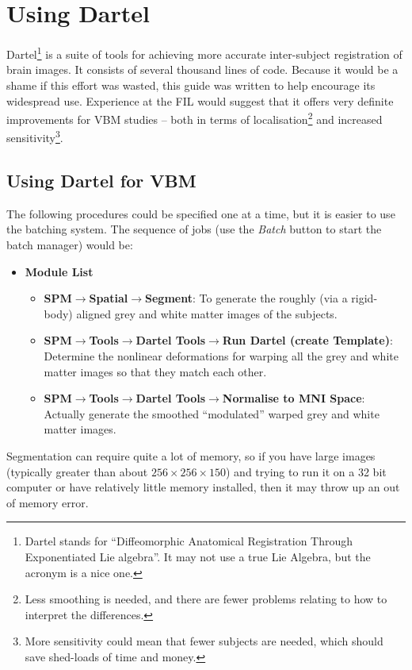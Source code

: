 \chapter{Using Dartel \label{Chap:dartelguide}}

Dartel\footnote{Dartel stands for ``Diffeomorphic Anatomical Registration Through Exponentiated Lie algebra''.
It may not use a true Lie Algebra, but the acronym is a nice one.} is a suite of tools for achieving more accurate inter-subject registration of brain images.
It consists of several thousand lines of code. Because it would be a shame if this effort was wasted, this guide was written to help encourage its widespread use.
Experience at the FIL would suggest that it offers very definite improvements for VBM studies -- both in terms of localisation\footnote{Less smoothing is needed, and there are fewer problems relating to how to interpret the differences.} and increased sensitivity\footnote{More sensitivity could mean that fewer subjects are needed, which should save shed-loads of time and money.}.



\section{Using Dartel for VBM \label{Sec:dartel_vbm}}
The following procedures could be specified one at a time, but it is easier to use the batching system.
The sequence of jobs (use the \emph{Batch} button to start the batch manager) would be:
\begin{itemize}
\item{{\bf Module List}
  \begin{itemize}
  \item{{\bf SPM$\rightarrow$Spatial$\rightarrow$Segment}: To generate the roughly (via a rigid-body) aligned grey and white matter images of the subjects.}
  \item{{\bf SPM$\rightarrow$Tools$\rightarrow$Dartel Tools$\rightarrow$Run Dartel (create Template)}: Determine the nonlinear deformations for warping all the grey and white matter images so that they match each other.}
  \item{{\bf SPM$\rightarrow$Tools$\rightarrow$Dartel Tools$\rightarrow$Normalise to MNI Space}: Actually generate the smoothed ``modulated'' warped grey and white matter images.}
  \end{itemize}
}
\end{itemize}
Segmentation can require quite a lot of memory, so if you have large images (typically greater than about $256\times256\times150$) and trying to run it on a 32 bit computer or have relatively little memory installed, then it may throw up an out of memory error.

